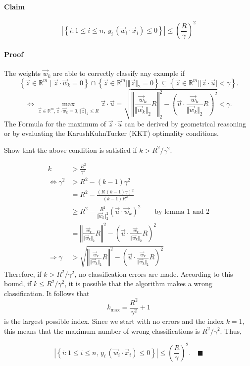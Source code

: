 \paragraph*{Claim}

\[
\left|\left\{ i:1\le i\le n,\, y_{i}\,(\vec{w}_{i}\cdot\vec{x}_{i})\leq0\right\} \right|\leq\left(\frac{R}{\gamma}\right)^{2}
\]



\paragraph*{Proof}

The weights $\vec{w}_{k}$ are able to correctly classify any example
if
\[
\left\{ \vec{z}\in\mathbb{R}^{m}\mid\vec{z}\cdot\vec{w}_{k}=0\right\} \cap\left\{ \vec{z}\in\mathbb{R}^{m}\mid\Vert\vec{z}\Vert_{2}=0\right\} \subseteq\left\{ \vec{z}\in\mathbb{R}^{m}\mid\vert\vec{z}\cdot\vec{u}\vert<\gamma\right\} .
\]
\[
\Leftrightarrow\max_{\vec{z}\in\mathbb{R}^{m},\vec{z}\cdot\vec{w}_{k}=0,\Vert\vec{z}\Vert_{2}\leq R}\vec{z}\cdot\vec{u}=\sqrt{\left\Vert \frac{\vec{w}_{k}}{\Vert\vec{w}_{k}\Vert_{2}}R\right\Vert _{2}^{2}-\left(\vec{u}\cdot\frac{\vec{w}_{k}}{\Vert\vec{w}_{k}\Vert_{2}}R\right)^{2}}<\gamma.
\]
The Formula for the maximum of $\vec{z}\cdot\vec{u}$ can be derived
by geometrical reasoning or by evaluating the Karush\textendash{}Kuhn\textendash{}Tucker
(KKT) optimality conditions.

Show that the above condition is satisfied if $k>R^{2}/\gamma^{2}$.

\begin{align*}
k & >\frac{R^{2}}{\gamma^{2}}\\
\Leftrightarrow\gamma^{2} & >R^{2}-(k-1)\gamma^{2}\\
 & =R^{2}-\frac{\left(R\,\left(k-1\right)\gamma\right){}^{2}}{\left(k-1\right)R^{2}}\\
 & \geq R^{2}-\frac{R^{2}}{\Vert\vec{w}_{k}\Vert_{2}^{2}}\left(\vec{u}\cdot\vec{w}_{k}\right)^{2}\qquad\text{by lemma 1 and 2}\\
 & =\left\Vert \frac{\vec{w}_{k}}{\Vert\vec{w}_{k}\Vert_{2}}R\right\Vert ^{2}-\left(\vec{u}\cdot\frac{\vec{w}_{k}}{\Vert\vec{w}_{k}\Vert_{2}}R\right)^{2}\\
\Rightarrow\gamma & >\sqrt{\left\Vert \frac{\vec{w}_{k}}{\Vert\vec{w}_{k}\Vert_{2}}R\right\Vert ^{2}-\left(\vec{u}\cdot\frac{\vec{w}_{k}}{\Vert\vec{w}_{k}\Vert_{2}}R\right)^{2}}
\end{align*}
Therefore, if $k>R^{2}/\gamma^{2}$, no classification errors are
made. According to this bound, if $k\leq R^{2}/\gamma^{2}$, it is
possible that the algorithm makes a wrong classification. It follows
that 
\[
k_{\max}=\frac{R^{2}}{\gamma^{2}}+1
\]
 is the largest possible index. Since we start with no errors and
the index $k=1$, this means that the maximum number of wrong classifications
is $R^{2}/\gamma^{2}.$ Thus,

\[
\left|\left\{ i:1\le i\le n,\, y_{i}\,(\vec{w}_{i}\cdot\vec{x}_{i})\leq0\right\} \right|\leq\left(\frac{R}{\gamma}\right)^{2}.\quad\blacksquare
\]